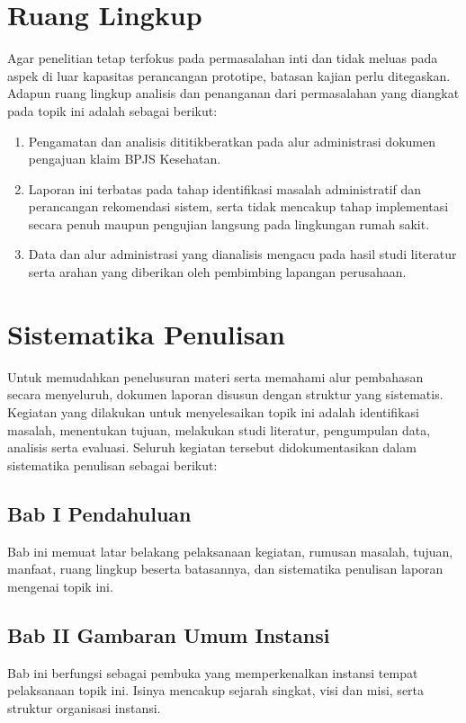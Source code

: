 \section{Ruang Lingkup}
Agar penelitian tetap terfokus pada permasalahan inti dan tidak meluas pada aspek di luar kapasitas perancangan prototipe, batasan kajian perlu ditegaskan. Adapun ruang lingkup analisis dan penanganan dari permasalahan yang diangkat pada topik ini adalah sebagai berikut:
\begin{enumerate}
    \item Pengamatan dan analisis dititikberatkan pada alur administrasi dokumen pengajuan klaim BPJS Kesehatan.
    \item Laporan ini terbatas pada tahap identifikasi masalah administratif dan perancangan rekomendasi sistem, serta tidak mencakup tahap implementasi secara penuh maupun pengujian langsung pada lingkungan rumah sakit.
    \item Data dan alur administrasi yang dianalisis mengacu pada hasil studi literatur serta arahan yang diberikan oleh pembimbing lapangan perusahaan.
\end{enumerate}

\section{Sistematika Penulisan}
Untuk memudahkan penelusuran materi serta memahami alur pembahasan secara menyeluruh, dokumen laporan disusun dengan struktur yang sistematis. Kegiatan yang dilakukan untuk menyelesaikan topik ini adalah identifikasi masalah, menentukan tujuan, melakukan studi literatur, pengumpulan data, analisis serta evaluasi. Seluruh kegiatan tersebut didokumentasikan dalam sistematika penulisan sebagai berikut:

\subsection{Bab I Pendahuluan}
Bab ini memuat latar belakang pelaksanaan kegiatan, rumusan masalah, tujuan, manfaat, ruang lingkup beserta batasannya, dan sistematika penulisan laporan mengenai topik ini.

\subsection{Bab II Gambaran Umum Instansi}
Bab ini berfungsi sebagai pembuka yang memperkenalkan instansi tempat pelaksanaan topik ini. Isinya mencakup sejarah singkat, visi dan misi, serta struktur organisasi instansi.

